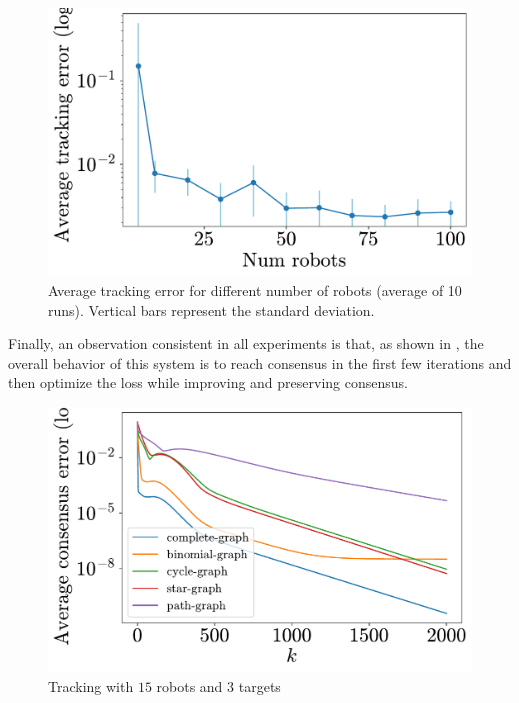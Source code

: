 \documentclass[a4paper,11pt,oneside]{book}
\begin{document}
\begin{figure}[htb!]
      \centering
      \includegraphics[width=0.46\linewidth]{./figs/tracking/average/tracking.pdf}
      \caption{Average tracking error for different number of robots (average of 10 runs). Vertical bars represent the standard deviation.}
      \label{fig:tracking_avg_error_runs}
\end{figure}


Finally, an observation consistent in all experiments is that, as shown in , the overall behavior of this system is to reach consensus in the first few iterations and then optimize the loss while improving and preserving consensus.

\begin{figure}[htb!]
      \centering
      \includegraphics[width=0.46\linewidth]{./figs/tracking/15_3_2_2000/consensus.pdf} 
      \caption{Tracking with $15$ robots and $3$ targets}
      \label{fig:tracking_consensus}
\end{figure}
\end{document}
